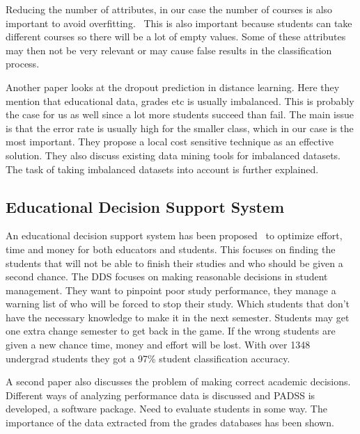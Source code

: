 \bigskip\noindent
Reducing the number of attributes, in our case the number of courses is also important to avoid overfitting.~\cite{9}
This is also important because students can take different courses so there will be a lot of empty values. 
Some of these attributes may then not be very relevant or may cause false results in the classification process.

\bigskip\noindent
Another paper looks at the dropout prediction in distance learning. 
Here they mention that educational data, grades etc is usually imbalanced. 
This is probably the case for us as well since a lot more students succeed than fail. 
The main issue is that the error rate is usually high for the smaller class, which in our case is the most important. 
They propose a local cost sensitive technique as an effective solution. 
They also discuss existing data mining tools for imbalanced datasets.~\cite{8,9,12} 
The task of taking imbalanced datasets into account is further explained.~\cite{10}

\subsection{Educational Decision Support System}
An educational decision support system has been proposed~\cite{5} to optimize effort, time and money for both educators and students. 
This focuses on finding the students that will not be able to finish their studies and who should be given a second chance. 
The DDS focuses on making reasonable decisions in student management. 
They want to pinpoint poor study performance, they manage a warning list of who will be forced to stop their study. 
Which students that don't have the necessary knowledge to make it in the next semester. 
Students may get one extra change semester to get back in the game. 
If the wrong students are given a new chance time, money and effort will be lost. 
With over 1348 undergrad students they got a 97\% student classification accuracy.

\bigskip\noindent
A second paper also discusses the problem of making correct academic decisions.~\cite{6} 
Different ways of analyzing performance data is discussed and PADSS is developed, a software package. 
Need to evaluate students in some way. The importance of the data extracted from the grades databases has been shown. 

